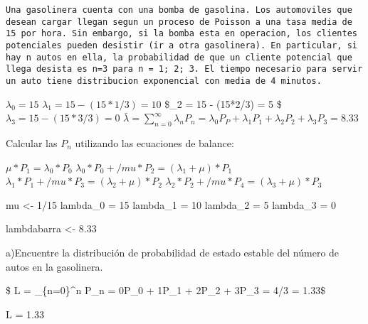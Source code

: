 \documentclass[
]{article}
\newenvironment{Shaded}{\begin{snugshade}}{\end{snugshade}}
\newcommand{\DecValTok}[1]{\textcolor[rgb]{0.00,0.00,0.81}{#1}}
\newcommand{\FloatTok}[1]{\textcolor[rgb]{0.00,0.00,0.81}{#1}}
\newcommand{\NormalTok}[1]{#1}
\newcommand{\OtherTok}[1]{\textcolor[rgb]{0.56,0.35,0.01}{#1}}
\newcommand{\SpecialCharTok}[1]{\textcolor[rgb]{0.00,0.00,0.00}{#1}}
\begin{document}
\begin{verbatim}
Una gasolinera cuenta con una bomba de gasolina. Los automoviles que desean cargar llegan segun un proceso de Poisson a una tasa media de 15 por hora. Sin embargo, si la bomba esta en operacion, los clientes potenciales pueden desistir (ir a otra gasolinera). En particular, si hay n autos en ella, la probabilidad de que un cliente potencial que llega desista es n=3 para n = 1; 2; 3. El tiempo necesario para servir un auto tiene distribucion exponencial con media de 4 minutos.
\end{verbatim}

\(\lambda_0 = 15\) \(\lambda_1 = 15 - (15*1/3) = 10\) \$\lambda\_2 = 15
- (15*2/3) = 5 \$ \(\lambda_3 = 15 - (15*3/3) = 0\)
\(\bar\lambda = \sum_{n = 0}^\infty \lambda_n P_n = \lambda_0P_P + \lambda_1P_1 + \lambda_2P_2 + \lambda_3P_3 = 8.33\)

Calcular las \(P_n\) utilizando las ecuaciones de balance:

\(\mu*P_1 = \lambda_0*P_0\)
\(\lambda_0*P_0 + /mu*P_2 = (\lambda_1+\mu)*P_1\)
\(\lambda_1*P_1 + /mu*P_3 = (\lambda_2+\mu)*P_2\)
\(\lambda_2*P_2 + /mu*P_4 = (\lambda_3+\mu)*P_3\)

\begin{Shaded}
\begin{Highlighting}[]
\NormalTok{mu }\OtherTok{\textless{}{-}} \DecValTok{1}\SpecialCharTok{/}\DecValTok{15}
\NormalTok{lambda\_0 }\OtherTok{=} \DecValTok{15}
\NormalTok{lambda\_1 }\OtherTok{=} \DecValTok{10}
\NormalTok{lambda\_2 }\OtherTok{=} \DecValTok{5}
\NormalTok{lambda\_3 }\OtherTok{=} \DecValTok{0}
\end{Highlighting}
\end{Shaded}

\begin{Shaded}
\begin{Highlighting}[]
\NormalTok{lambdabarra }\OtherTok{\textless{}{-}} \FloatTok{8.33}
\end{Highlighting}
\end{Shaded}

a)Encuentre la distribución de probabilidad de estado estable del número
de autos en la gasolinera.

\$ L = \displaystyle\sum\_\{n=0\}\^{}\infty n P\_n = 0P\_0 + 1P\_1 +
2P\_2 + 3P\_3 = 4/3 = 1.33\$

\begin{Shaded}
\begin{Highlighting}[]
\NormalTok{L }\OtherTok{=} \FloatTok{1.33}
\end{Highlighting}
\end{Shaded}
\end{document}
